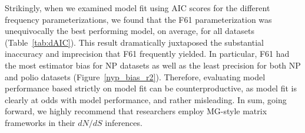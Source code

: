\documentclass[11pt]{article}
\begin{document}
Strikingly, when we examined model fit using AIC scores \cite{Akaike1974,BurnhamAnderson2004} for the different frequency parameterizations, we found that the F61 parameterization was unequivocally the best performing model, on average, for all datasets (Table~\ref{tab:dAIC}). This result dramatically juxtaposed the substantial inaccuracy and imprecision that F61 frequently yielded. In particular, F61 had the most estimator bias for NP datasets as well as the least precision for both NP and polio datasets (Figure~\ref{nyp_bias_r2}). Therefore, evaluating model performance based strictly on model fit can be counterproductive, as model fit is clearly at odds with model performance, and rather misleading. In sum, going forward, we highly recommend that researchers employ MG-style matrix frameworks in their $dN/dS$ inferences.




\end{document}
